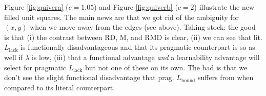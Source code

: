 \documentclass[fleqn,reqno,10pt]{article}
\newcommand{\mylang}[1]{\ensuremath{L_{\text{#1}}}\xspace} %
\newcommand{\Lbound}{\mylang{bound}}
\newcommand{\Llack}{\mylang{lack}}
\begin{document}
Figure \ref{fig:quivera} ($c = 1.05$) and Figure \ref{fig:quiverb} ($c = 2$) illustrate the new filled unit squares. The main news are that we got rid of the ambiguity for $(x,y)$ when we move away from the edges (see above). Taking stock: the good is that (i) the contrast between RD, M, and RMD is clear, (ii) we can see that lit. $\Llack$ is functionally disadvantageous and that its pragmatic counterpart is so as well if $\lambda$ is low, (iii) that a functional advantage {\em and} a learnability advantage will select for pragmatic $\Llack$ but not one of these on its own. The bad is that we don't see the slight functional disadvantage that prag. $\Lbound$ suffers from when compared to its literal counterpart.  
\end{document}
